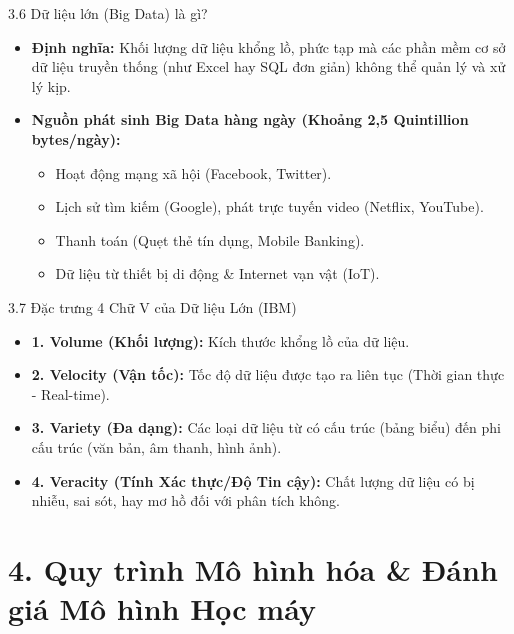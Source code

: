 \documentclass[aspectratio=169]{beamer}
\begin{document}
\begin{frame}{3.6 Dữ liệu lớn (Big Data) là gì?}
    \begin{itemize}
        \item \textbf{Định nghĩa:} Khối lượng dữ liệu khổng lồ, phức tạp mà các phần mềm cơ sở dữ liệu truyền thống (như Excel hay SQL đơn giản) không thể quản lý và xử lý kịp.
        \item \textbf{Nguồn phát sinh Big Data hàng ngày (Khoảng 2,5 Quintillion bytes/ngày):}
        \begin{itemize}
            \item Hoạt động mạng xã hội (Facebook, Twitter).
            \item Lịch sử tìm kiếm (Google), phát trực tuyến video (Netflix, YouTube).
            \item Thanh toán (Quẹt thẻ tín dụng, Mobile Banking).
            \item Dữ liệu từ thiết bị di động \& Internet vạn vật (IoT).
        \end{itemize}
    \end{itemize}
\end{frame}

\begin{frame}{3.7 Đặc trưng 4 Chữ V của Dữ liệu Lớn (IBM)}
    \begin{itemize}
        \item \textbf{1. Volume (Khối lượng):} Kích thước khổng lồ của dữ liệu.
        \item \textbf{2. Velocity (Vận tốc):} Tốc độ dữ liệu được tạo ra liên tục (Thời gian thực - Real-time).
        \item \textbf{3. Variety (Đa dạng):} Các loại dữ liệu từ có cấu trúc (bảng biểu) đến phi cấu trúc (văn bản, âm thanh, hình ảnh).
        \item \textbf{4. Veracity (Tính Xác thực/Độ Tin cậy):} Chất lượng dữ liệu có bị nhiễu, sai sót, hay mơ hồ đối với phân tích không.
    \end{itemize}
\end{frame}

\section{4. Quy trình Mô hình hóa \& Đánh giá Mô hình Học máy}
\end{document}
